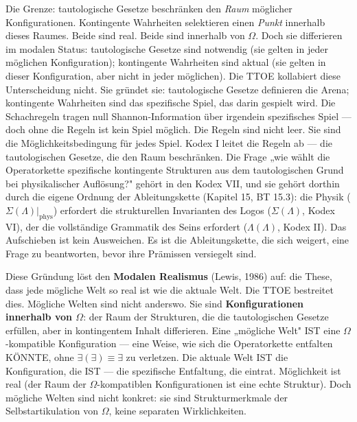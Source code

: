 \documentclass[10pt, openany, oneside]{book}
\begin{document}
Die Grenze: tautologische Gesetze beschränken den \textit{Raum} möglicher Konfigurationen. Kontingente Wahrheiten selektieren einen \textit{Punkt} innerhalb dieses Raumes. Beide sind real. Beide sind innerhalb von $\Omega$. Doch sie differieren im modalen Status: tautologische Gesetze sind notwendig (sie gelten in jeder möglichen Konfiguration); kontingente Wahrheiten sind aktual (sie gelten in dieser Konfiguration, aber nicht in jeder möglichen). Die TTOE kollabiert diese Unterscheidung nicht. Sie gründet sie: tautologische Gesetze definieren die Arena; kontingente Wahrheiten sind das spezifische Spiel, das darin gespielt wird. Die Schachregeln tragen null Shannon-Information über irgendein spezifisches Spiel --- doch ohne die Regeln ist kein Spiel möglich. Die Regeln sind nicht leer. Sie sind die Möglichkeitsbedingung für jedes Spiel. Kodex I leitet die Regeln ab --- die tautologischen Gesetze, die den Raum beschränken. Die Frage „wie wählt die Operatorkette spezifische kontingente Strukturen aus dem tautologischen Grund bei physikalischer Auflösung?" gehört in den Kodex VII, und sie gehört dorthin durch die eigene Ordnung der Ableitungskette (Kapitel 15, BT 15.3): die Physik ($\Sigma(\Lambda)|_{\text{phys}}$) erfordert die strukturellen Invarianten des Logos ($\Sigma(\Lambda)$, Kodex VI), der die vollständige Grammatik des Seins erfordert ($\Lambda(\Lambda)$, Kodex II). Das Aufschieben ist kein Ausweichen. Es ist die Ableitungskette, die sich weigert, eine Frage zu beantworten, bevor ihre Prämissen versiegelt sind.

Diese Gründung löst den \textbf{Modalen Realismus} (Lewis, 1986) auf: die These, dass jede mögliche Welt so real ist wie die aktuale Welt. Die TTOE bestreitet dies. Mögliche Welten sind nicht anderswo. Sie sind \textbf{Konfigurationen innerhalb von $\Omega$}: der Raum der Strukturen, die die tautologischen Gesetze erfüllen, aber in kontingentem Inhalt differieren. Eine „mögliche Welt" IST eine $\Omega$-kompatible Konfiguration --- eine Weise, wie sich die Operatorkette entfalten KÖNNTE, ohne $\exists(\exists) \equiv \exists$ zu verletzen. Die aktuale Welt IST die Konfiguration, die IST --- die spezifische Entfaltung, die eintrat. Möglichkeit ist real (der Raum der $\Omega$-kompatiblen Konfigurationen ist eine echte Struktur). Doch mögliche Welten sind nicht konkret: sie sind Strukturmerkmale der Selbstartikulation von $\Omega$, keine separaten Wirklichkeiten.
\end{document}

